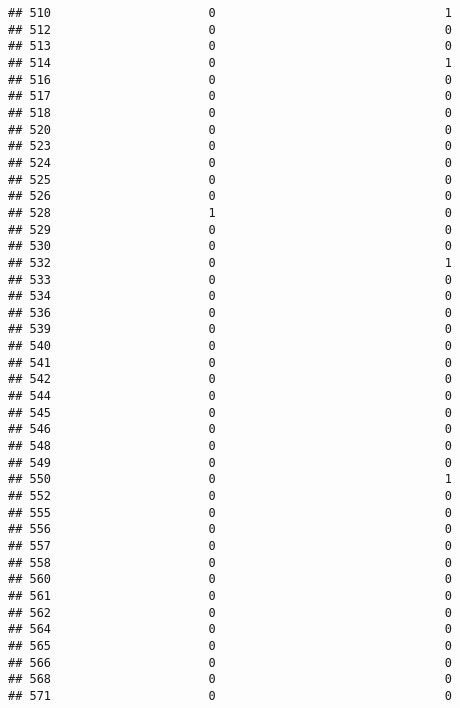 \documentclass[
]{article}
\begin{document}
\begin{verbatim}
## 510                      0                                1
## 512                      0                                0
## 513                      0                                0
## 514                      0                                1
## 516                      0                                0
## 517                      0                                0
## 518                      0                                0
## 520                      0                                0
## 523                      0                                0
## 524                      0                                0
## 525                      0                                0
## 526                      0                                0
## 528                      1                                0
## 529                      0                                0
## 530                      0                                0
## 532                      0                                1
## 533                      0                                0
## 534                      0                                0
## 536                      0                                0
## 539                      0                                0
## 540                      0                                0
## 541                      0                                0
## 542                      0                                0
## 544                      0                                0
## 545                      0                                0
## 546                      0                                0
## 548                      0                                0
## 549                      0                                0
## 550                      0                                1
## 552                      0                                0
## 555                      0                                0
## 556                      0                                0
## 557                      0                                0
## 558                      0                                0
## 560                      0                                0
## 561                      0                                0
## 562                      0                                0
## 564                      0                                0
## 565                      0                                0
## 566                      0                                0
## 568                      0                                0
## 571                      0                                0

\end{verbatim}
\end{document}

